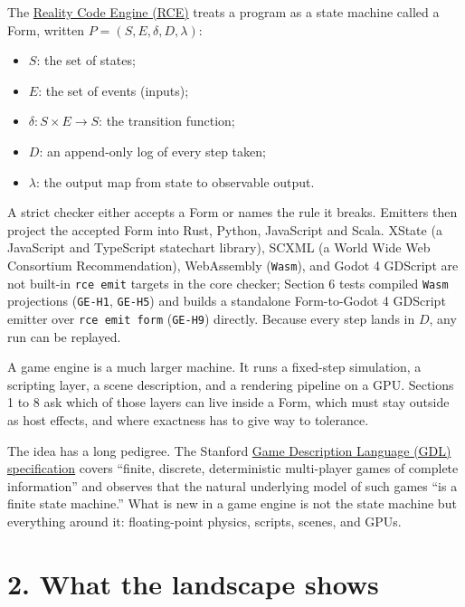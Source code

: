 \documentclass[10pt,letterpaper]{article}
\providecommand{\tightlist}{\setlength{\itemsep}{1pt}\setlength{\parskip}{0pt}}
\begin{document}
The \href{https://research.openie.dev/about/rce/}{Reality Code Engine
(RCE)} treats a program as a state machine called a Form, written
\(P = (S, E, \delta, D, \lambda)\):

\begin{itemize}
\tightlist
\item
  \(S\): the set of states;
\item
  \(E\): the set of events (inputs);
\item
  \(\delta : S \times E \to S\): the transition function;
\item
  \(D\): an append-only log of every step taken;
\item
  \(\lambda\): the output map from state to observable output.
\end{itemize}

A strict checker either accepts a Form or names the rule it breaks.
Emitters then project the accepted Form into Rust, Python, JavaScript
and Scala. XState (a JavaScript and TypeScript statechart library),
SCXML (a World Wide Web Consortium Recommendation), WebAssembly
(\texttt{Wasm}), and Godot 4 GDScript are not built-in
\texttt{rce\ emit} targets in the core checker; Section 6 tests compiled
\texttt{Wasm} projections (\texttt{GE-H1}, \texttt{GE-H5}) and builds a
standalone Form-to-Godot 4 GDScript emitter over
\texttt{rce\ emit\ form} (\texttt{GE-H9}) directly. Because every step
lands in \(D\), any run can be replayed.

A game engine is a much larger machine. It runs a fixed-step simulation,
a scripting layer, a scene description, and a rendering pipeline on a
GPU. Sections 1 to 8 ask which of those layers can live inside a Form,
which must stay outside as host effects, and where exactness has to give
way to tolerance.

The idea has a long pedigree. The Stanford
\href{http://ggp.stanford.edu/readings/gdl_spec.pdf}{Game Description
Language (GDL) specification} covers ``finite, discrete, deterministic
multi-player games of complete information'' and observes that the
natural underlying model of such games ``is a finite state machine.''
What is new in a game engine is not the state machine but everything
around it: floating-point physics, scripts, scenes, and GPUs.

\section{2. What the landscape shows}\label{what-the-landscape-shows}
\end{document}
